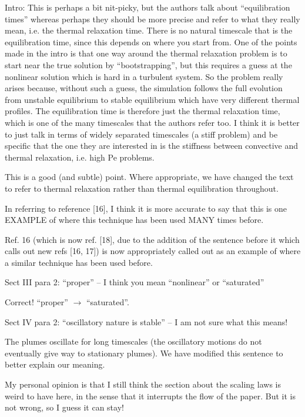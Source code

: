 \documentclass[aps, 11pt, singlecolumn]{revtex4-1} %
\begin{document}
\begin{singlespace}
\begin{myquotation}
Intro:  This is perhaps a bit nit-picky, but the authors talk about
“equilibration times” whereas perhaps they should be more precise and refer to
what they really mean, i.e. the thermal relaxation time.   There is no natural
timescale that is the equilibration time, since this depends on where you start
from.  One of the points made in the intro is that one way around the thermal
relaxation problem is to start near the true solution by “bootstrapping”, but
this requires a guess at the nonlinear solution which is hard in a turbulent
system.  So the problem really arises because, without such a guess, the
simulation follows the full evolution from unstable equilibrium to stable
equilibrium which have very different thermal profiles.  The equilibration time
is therefore just the thermal relaxation time, which is one of the many
timescales that the authors refer too.  I think it is better to just talk in
terms of widely separated timescales (a stiff problem) and be specific that the
one they are interested in is the stiffness between convective and thermal
relaxation, i.e. high Pe problems.
\end{myquotation}
This is a good (and subtle) point. Where appropriate, we have changed the text
to refer to thermal relaxation rather than thermal equilibration throughout.

\begin{myquotation}
In referring to reference [16], I think it is more accurate to say that this is
one EXAMPLE of where this technique has been used MANY times before.
\end{myquotation}
Ref. 16 (which is now ref. [18], due to the addition of the sentence before it
which calls out new refs [16, 17]) is now appropriately called out as an example
of where a similar technique has been used before.

\begin{myquotation}
Sect III para 2:  ``proper'' -- I think you mean ``nonlinear'' or ``saturated''
\end{myquotation}
Correct! ``proper'' $\rightarrow$ ``saturated''.

\begin{myquotation}
Sect IV para 2: ``oscillatory nature is stable''  -- I am not sure what this means!
\end{myquotation}
The plumes oscillate for long timescales (the oscillatory motions do not
eventually give way to stationary plumes). We have modified this sentence to
better explain our meaning.

\begin{myquotation}
My personal opinion is that I still think the section about the scaling laws is
weird to have here, in the sense that it interrupts the flow of the paper.  But
it is not wrong, so I guess it can stay!


\end{myquotation}
\end{singlespace}
\end{document}
